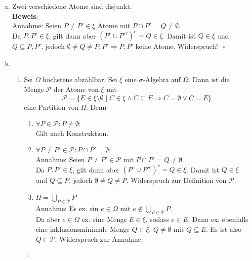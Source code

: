 \documentclass[11pt,a4paper,ngerman]{article}
\begin{document}
\begin{enumerate}[a)]
\item Zwei verschiedene Atome sind disjunkt. \\
	\textbf{Beweis}: \\
Annahme: Seien $P \neq P' \in \xi$ Atome mit $P \cap P' = Q \neq \emptyset$.\\
 Da $P, P' \in \xi$, gilt dann aber $(P^c \cup P'^c)^c = Q \in \xi$.
Damit ist $Q \in\xi$ und $Q \subseteq P,P'$, jedoch $\emptyset \neq Q \neq P,P' \Rightarrow P,P'$ keine Atome. Widerspruch!
 $\mbox{}$ \hfill $\square$

\item 
\begin{enumerate}[(1)]
\item Sei $\Omega$ höchstens abzählbar. Sei $\xi$ eine $\sigma$-Algebra auf $\Omega$. Dann ist die Menge $\mathcal{P}$ der Atome von $\xi$ mit
\begin{equation*}\mathcal{P} = \{ E \in \xi \setminus \emptyset \; | \; C \in \xi \land C \subseteq E \Rightarrow C = \emptyset \lor C = E  \} \end{equation*}
eine Partition von $\Omega$. Denn 

\begin{enumerate}[(1)]
\item $\forall P \in \mathcal{P}: P \neq \emptyset$: \\
Gilt nach Konstruktion.

\item $\forall P \neq P' \in \mathcal{P}: P \cap P' = \emptyset$: \\
Annahme: Seien $P \neq P' \in \mathcal{P}$ mit $P \cap P' = Q \neq \emptyset$.\\
 Da $P, P' \in \xi$, gilt dann aber $(P^c \cup P'^c)^c = Q \in \xi$.
Damit ist $Q \in\xi$ und $Q \subseteq P$, jedoch $\emptyset \neq Q \neq P$. Widerspruch zur Definition von $\mathcal{P}$.

\item $\Omega = \bigcup_{P \in \mathcal{P}} P $ \\
Annahme: Es ex. ein $e \in \Omega$ mit $e \notin  \bigcup_{P \in \mathcal{P}} P$. \\
Da aber $e \in \Omega$ ex. eine Menge $E \in \xi$, sodass $e  \in E$. Dann ex. ebenfalls eine inklusionsminimale Menge $Q \in \xi$, $Q \neq \emptyset$ mit $Q \subseteq E$.
Es ist also $Q \in \mathcal{P}$. Widerspruch zur Annahme. \\
\end{enumerate}
 $\mbox{}$ \hfill $\square$



\end{enumerate}
\end{enumerate}
\end{document}
